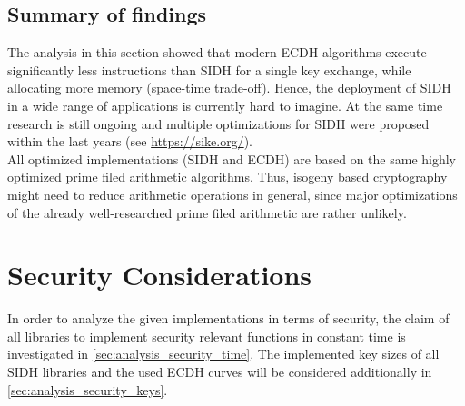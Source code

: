 \subsection{Summary of findings}
\label{sec:analysis_ecdh_sidh_findings}

The analysis in this section showed that modern \gls{ECDH} algorithms execute significantly less instructions than \gls{SIDH} for a single key exchange, while allocating more memory (space-time trade-off). Hence, the deployment of \gls{SIDH} in a wide range of applications is currently hard to imagine. At the same time research is still ongoing and multiple optimizations for \gls{SIDH} were proposed within the last years (see \url{https://sike.org/}).\\
All optimized implementations (\gls{SIDH} and \gls{ECDH}) are based on the same highly optimized prime filed arithmetic algorithms. Thus, isogeny based cryptography might need to reduce arithmetic operations in general, since major optimizations of the already well-researched prime filed arithmetic are rather unlikely.

\section{Security Considerations}\label{sec:analysis_security}

In order to analyze the given implementations in terms of security, the claim of all libraries to implement security relevant functions in constant time is investigated in \autoref{sec:analysis_security_time}. The implemented key sizes of all \gls{SIDH} libraries and the used \gls{ECDH} curves will be considered additionally in \autoref{sec:analysis_security_keys}.

